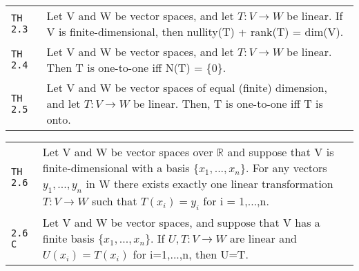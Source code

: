 \documentclass[10pt,landscape]{article}
\begin{document}
\begin{multicols}{3}
\begin{tabular}{@{}p{\the\MyLen}%
                @{}p{\linewidth-\the\MyLen}@{}}
\verb!TH 2.3! & Let V and W be vector spaces, and let $T:V\rightarrow W$ be linear. If V is finite-dimensional, then nullity(T) + rank(T) = dim(V).\\
\verb!TH 2.4! & Let V and W be vector spaces, and let $T:V\rightarrow W$ be linear. Then T is one-to-one iff N(T) = \{0\}.\\
\verb!TH 2.5! & Let V and W be vector spaces of equal (finite) dimension, and let $T:V\rightarrow W$ be linear. Then, T is one-to-one iff T is onto.\\
\end{tabular}
\begin{tabular}{@{}p{\the\MyLen}%
                @{}p{\linewidth-\the\MyLen}@{}} %
\verb!TH 2.6! & Let V and W be vector spaces over $\mathbb{R}$ and suppose that V is finite-dimensional with a basis $\{x_1 ,..., x_n\}$. For any vectors $y_1 ,..., y_n$ in W there exists exactly one linear transformation $T:V\rightarrow W$ such that $T(x_i) = y_i$ for i = 1,...,n.\\
\verb!2.6 C! & Let V and W be vector spaces, and suppose that V has a finite basis $\{x_1 ,..., x_n\}$. If $U,T:V\rightarrow W$ are linear and $U(x_i) = T(x_i)$ for i=1,...,n, then U=T.
\end{tabular}


\end{multicols}
\end{document}
